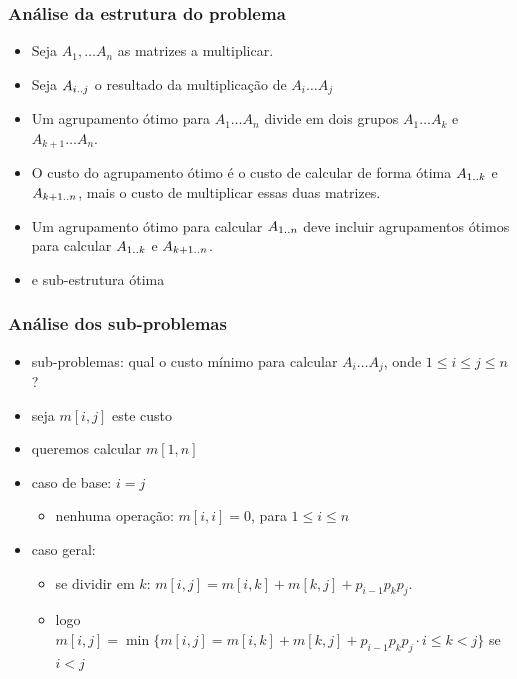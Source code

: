 \documentclass{beamer}
\begin{document}
\begin{frame}

\frametitle{Análise da estrutura do problema}

\begin{itemize}
\item Seja $A_1, \ldots A_n$ as matrizes a multiplicar.
\item Seja $A_{i \mathinner{\ldotp\ldotp} j}$ o resultado da multiplicação de $A_i \ldots A_j$
\item Um agrupamento ótimo para $A_1 \ldots A_n$ divide em dois grupos
$A_1 \ldots A_k$ e $A_{k+1} \ldots A_n$.
\item O custo do agrupamento ótimo é o custo de calcular de forma ótima
$A_{1 \mathinner{\ldotp\ldotp} k}$ e $A_{k+1 \mathinner{\ldotp\ldotp} n}$, mais o custo de multiplicar essas
duas matrizes.
\item Um agrupamento ótimo para calcular $A_{1 \mathinner{\ldotp\ldotp} n}$ deve incluir 
agrupamentos ótimos para calcular $A_{1 \mathinner{\ldotp\ldotp} k}$ e $A_{k+1 \mathinner{\ldotp\ldotp} n}$.
\item e \alert{sub-estrutura ótima}
\end{itemize}

\end{frame}


\begin{frame}

\frametitle{Análise dos sub-problemas}

\begin{itemize}
\item sub-problemas: qual o custo mínimo para calcular $A_i \ldots A_j$, onde $1 \le i \le j \le n$?
\item seja $m[i, j]$ este custo
\item queremos calcular $m[1, n]$
\item caso de base: $i = j$
\begin{itemize}
\item nenhuma operação: $m[i, i] = 0$, para $1 \le i \le n$
\end{itemize}
\item caso geral:
\begin{itemize}
\item se dividir em $k$: $m[i, j] = m[i, k] + m[k, j] + p_{i-1}p_kp_j$.
\item logo $m[i, j] = \min \{ m[i, j] = m[i, k] + m[k, j] + p_{i-1}p_kp_j \cdot i \le k < j \}$ se $i < j$
\end{itemize}
\end{itemize}

\end{frame}
\end{document}
